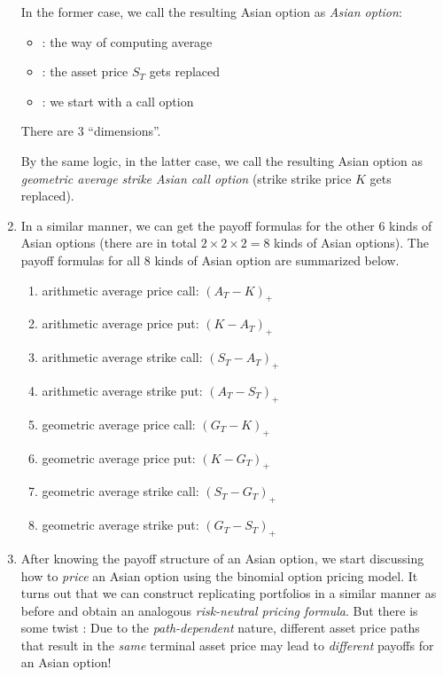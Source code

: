 \begin{enumerate}
In the former case, we call the resulting Asian option as \emph{  Asian  option}:
\begin{itemize}
\item {}: the way of computing average
\item {}: the asset price \(S_T\) gets replaced
\item {}: we start with a call option
\end{itemize}
There are 3 ``dimensions''.

By the same logic, in the latter case, we call the resulting Asian option as
\emph{geometric average strike Asian call option} (strike 
strike price \(K\) gets replaced).

\item In a similar manner, we can get the payoff formulas for the other 6 kinds
of Asian options (there are in total \(2\times 2\times 2=8\) kinds of Asian
options). The payoff formulas for all 8 kinds of Asian option are summarized
below.
\begin{enumerate}[label={(\arabic*)}]
\item arithmetic average price call: \((A_T-K)_{+}\)
\item arithmetic average price put: \((K-A_T)_{+}\)
\item arithmetic average strike call: \((S_T-A_T)_{+}\)
\item arithmetic average strike put: \((A_T-S_T)_{+}\)
\item geometric average price call: \((G_T-K)_{+}\)
\item geometric average price put: \((K-G_T)_{+}\)
\item geometric average strike call: \((S_T-G_T)_{+}\)
\item geometric average strike put: \((G_T-S_T)_{+}\)
\end{enumerate}
\item After knowing the payoff structure of an Asian option, we start
discussing how to \emph{price} an Asian option using the binomial option
pricing model. It turns out that we can construct replicating portfolios in a
similar manner as before and obtain an analogous \emph{risk-neutral pricing
formula}. But there is some twist \warn{}: Due to the \emph{path-dependent}
nature, different asset price paths that result in the \emph{same} terminal asset
price may lead to \emph{different} payoffs for an Asian option!


\end{enumerate}
